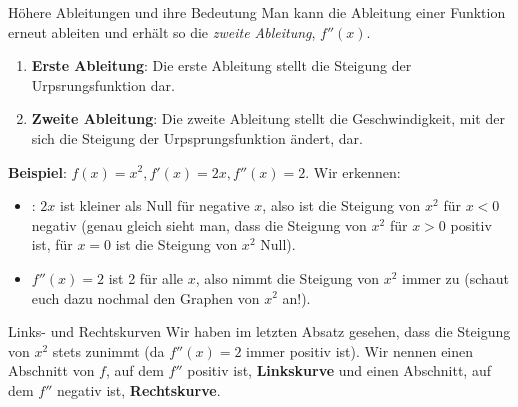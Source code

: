 \begin{bla}{Höhere Ableitungen und ihre Bedeutung}
  Man kann die Ableitung einer Funktion erneut ableiten und erhält so die \emph{zweite Ableitung}, $f''(x)$.
  \begin{enumerate}
    \item \textbf{Erste Ableitung}: Die erste Ableitung stellt die Steigung der Urpsrungsfunktion dar.
    \item \textbf{Zweite Ableitung}: Die zweite Ableitung stellt die Geschwindigkeit, mit der sich die Steigung der Urpsprungsfunktion ändert, dar.
  \end{enumerate}
  \textbf{Beispiel}: $f(x)=x^2, f'(x)=2x, f''(x)=2$. Wir erkennen:
  \begin{itemize}
    \item: $2x$ ist kleiner als Null für negative $x$, also ist die Steigung von $x^2$ für $x<0$ negativ (genau gleich sieht man, dass die Steigung von $x^2$ für $x>0$ positiv ist, für $x=0$ ist die Steigung von $x^2$ Null).
    \item $f''(x)=2$ ist 2 für alle $x$, also nimmt die Steigung von $x^2$ immer zu (schaut euch dazu nochmal den Graphen von $x^2$ an!).
  \end{itemize}
\end{bla}

\begin{bla}{Links- und Rechtskurven}
  Wir haben im letzten Absatz gesehen, dass die Steigung von $x^2$ stets zunimmt (da $f''(x)=2$ immer positiv ist). Wir nennen einen Abschnitt von $f$, auf dem $f''$ positiv ist, \textbf{Linkskurve} und einen Abschnitt, auf dem $f''$ negativ ist, \textbf{Rechtskurve}.
\end{bla}

\begin{marginfigure}
  \caption{$f(x)=x^3$ ist vor $0$ eine Rechts- und danach eine Linkskurve. Ihr könnt euch vorstellen, dass ihr von $-\infty$ nach $\infty$ auf dem Graphen entlangfahrt.}
\end{marginfigure}
